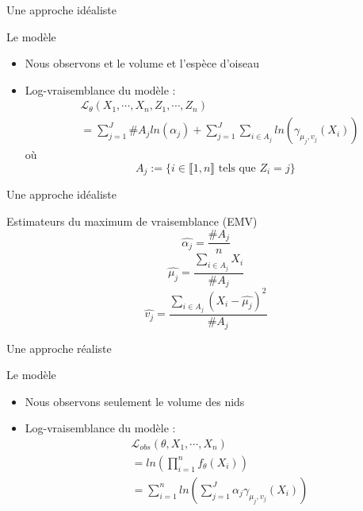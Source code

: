 \documentclass[11pt]{beamer}
\begin{document}
	

	\begin{frame}{Une approche idéaliste}
		\begin{block}{Le modèle}
			\begin{itemize}
				\item Nous observons et le volume et l'espèce d'oiseau
				\item Log-vraisemblance du modèle :
				\begin{align*}
				& \mathcal{L}_\theta(X_1, \cdots, X_n, Z_1, \cdots, Z_n) \\
				&=\displaystyle\sum_{j=1}^J \#A_j ln(\alpha_j)+ \sum_{j=1}^J\sum_{i\in A_j} ln(\gamma_{\mu_j, v_j}(X_i))
				\end{align*}
				où
				\[
				A_j := \{ i\in \llbracket1,n \rrbracket \text{ tels que } Z_i = j \}
				\]
			\end{itemize}
		\end{block}
	\end{frame}

	\begin{frame}{Une approche idéaliste}
		\begin{block}{Estimateurs du maximum de vraisemblance (EMV)}
			\[
			\widehat{\alpha_j} = \frac{\#A_j}{n}
			\]
			\[
			\widehat{\mu_j} = \displaystyle\frac{\sum_{i\in A_j} X_i}{\#A_j}
			\]
			\[
			\widehat{v_j} = \displaystyle \frac{\sum_{i\in A_j}(X_i - \widehat{\mu_j})^2}{\#A_j}
			\]
		\end{block}
	\end{frame}


	\begin{frame}{Une approche réaliste}
		\begin{block}{Le modèle}
			\begin{itemize}
				\item Nous observons seulement le volume des nids
				\item Log-vraisemblance du modèle :
				\begin{align*}
					& \mathcal{L}_{obs}(\theta, X_1, \cdots, X_n) \\
					&= ln\left( \displaystyle\prod_{i=1}^n f_\theta(X_i) \right)\\
					&= \displaystyle\sum_{i=1}^nln\left( \sum_{j=1}^J \alpha_j \gamma_{\mu_j, v_j}(X_i) \right)
				\end{align*}
			\end{itemize}
		\end{block}
	\end{frame}
\end{document}
